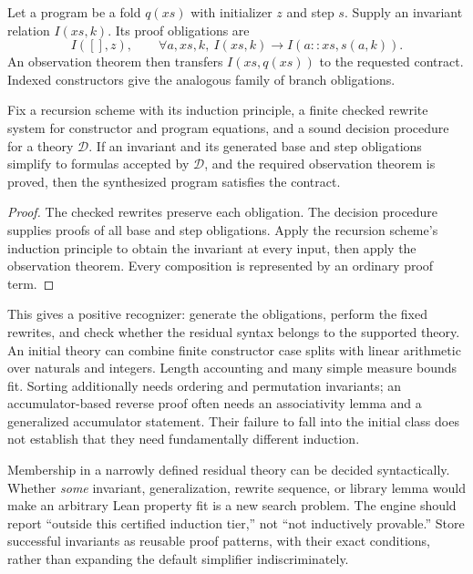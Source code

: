 
Let a program be a fold $q(xs)$ with initializer $z$ and step $s$. Supply an
invariant relation $I(xs,k)$. Its proof obligations are
\[
 I([],z),\qquad
 \forall a,xs,k,\ I(xs,k)\to I(a::xs,s(a,k)).
 \tag{8}\label{eq:inductionvc}
\]
An observation theorem then transfers $I(xs,q(xs))$ to the requested contract.
Indexed constructors give the analogous family of branch obligations.

\begin{theorem}\label{thm:vc}
Fix a recursion scheme with its induction principle, a finite checked rewrite
system for constructor and program equations, and a sound decision procedure
for a theory $\mathcal D$. If an invariant and its generated base and step
obligations simplify to formulas accepted by $\mathcal D$, and the required
observation theorem is proved, then the synthesized program satisfies the
contract.
\end{theorem}
\begin{proof}
The checked rewrites preserve each obligation. The decision procedure supplies
proofs of all base and step obligations. Apply the recursion scheme's induction
principle to obtain the invariant at every input, then apply the observation
theorem. Every composition is represented by an ordinary proof term.
\end{proof}

This gives a positive recognizer: generate the obligations, perform the fixed
rewrites, and check whether the residual syntax belongs to the supported
theory. An initial theory can combine finite constructor case splits with
linear arithmetic over naturals and integers. Length accounting and many
simple measure bounds fit. Sorting additionally needs ordering and permutation
invariants; an accumulator-based reverse proof often needs an associativity
lemma and a generalized accumulator statement. Their failure to fall into the
initial class does not establish that they need fundamentally different
induction.

Membership in a narrowly defined residual theory can be decided syntactically.
Whether \emph{some} invariant, generalization, rewrite sequence, or library
lemma would make an arbitrary Lean property fit is a new search problem.
The engine should report ``outside this certified induction tier,'' not
``not inductively provable.'' Store successful invariants as reusable proof
patterns, with their exact conditions, rather than expanding the default
simplifier indiscriminately.

